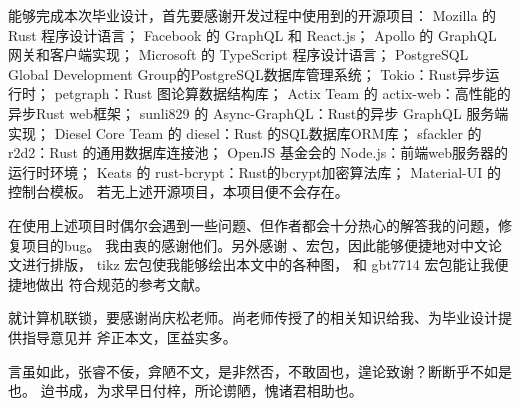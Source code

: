 \begin{arigatou}
    能够完成本次毕业设计，首先要感谢开发过程中使用到的开源项目：
    Mozilla 的 Rust 程序设计语言；
    Facebook 的 GraphQL 和 React.js；
    Apollo 的 GraphQL 网关和客户端实现；
    Microsoft 的 TypeScript 程序设计语言；
    PostgreSQL Global Development Group的PostgreSQL数据库管理系统；
    Tokio：Rust异步运行时；
    petgraph：Rust 图论算数据结构库；
    Actix Team 的 actix-web：高性能的异步Rust web框架；
    sunli829 的 Async-GraphQL：Rust的异步 GraphQL 服务端实现；
    Diesel Core Team 的 diesel：Rust 的SQL数据库ORM库；
    sfackler 的 r2d2：Rust 的通用数据库连接池；
    OpenJS 基金会的 Node.js：前端web服务器的运行时环境；
    Keats 的 rust-bcrypt：Rust的bcrypt加密算法库；
    Material-UI 的控制台模板。
    若无上述开源项目，本项目便不会存在。

    在使用上述项目时偶尔会遇到一些问题、但作者都会十分热心的解答我的问题，修复项目的bug。
    我由衷的感谢他们。另外感谢 、\CTeX 宏包，因此能够便捷地对中文论文进行排版，
    tikz 宏包使我能够绘出本文中的各种图， 和 gbt7714 宏包能让我便捷地做出
    符合规范的参考文献。

    就计算机联锁，要感谢尚庆松老师。尚老师传授了的相关知识给我、为毕业设计提供指导意见并
    斧正本文，匡益实多。

    言虽如此，张睿不佞，弇陋不文，是非然否，不敢固也，遑论致谢？断断乎不如是也。
    迨书成，为求早日付梓，所论谫陋，愧诸君相助也。
\end{arigatou}